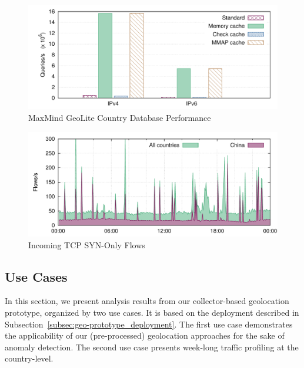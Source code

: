 \begin{figure}[!tb]
    \centering
    \includegraphics[width=\textwidth]{figures/paper-geolocation/performance/performance}
    \caption{MaxMind GeoLite Country Database Performance}
    \label{fig:geo-mm-perf}
\end{figure}

\begin{figure}[!tb]
    \centering
    \includegraphics[width=\textwidth]{figures/paper-geolocation/ctry-cn-tw/flows}
    \caption{Incoming TCP SYN-Only Flows}
    \label{fig:geo-tcp-syn}
\end{figure}

\subsection{Use Cases} \label{subsec:geo-use_cases}

In this section, we present analysis results from our collector-based geolocation prototype, organized by two use cases. It is based on the deployment described in Subsection~\ref{subsec:geo-prototype_deployment}. The first use case demonstrates the applicability of our (pre-processed) geolocation approaches for the sake of anomaly detection. The second use case presents week-long traffic profiling at the country-level.

